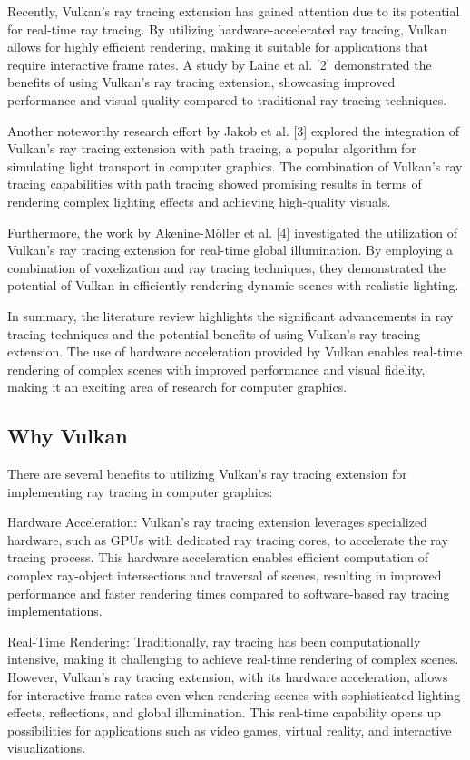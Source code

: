 \documentclass[conference]{IEEEtran}
\begin{document}
Recently, Vulkan's ray tracing extension has gained attention due to its potential for real-time ray tracing. By utilizing hardware-accelerated ray tracing, Vulkan allows for highly efficient rendering, making it suitable for applications that require interactive frame rates. A study by Laine et al. [2] demonstrated the benefits of using Vulkan's ray tracing extension, showcasing improved performance and visual quality compared to traditional ray tracing techniques.

Another noteworthy research effort by Jakob et al. [3] explored the integration of Vulkan's ray tracing extension with path tracing, a popular algorithm for simulating light transport in computer graphics. The combination of Vulkan's ray tracing capabilities with path tracing showed promising results in terms of rendering complex lighting effects and achieving high-quality visuals.

Furthermore, the work by Akenine-Möller et al. [4] investigated the utilization of Vulkan's ray tracing extension for real-time global illumination. By employing a combination of voxelization and ray tracing techniques, they demonstrated the potential of Vulkan in efficiently rendering dynamic scenes with realistic lighting.

In summary, the literature review highlights the significant advancements in ray tracing techniques and the potential benefits of using Vulkan's ray tracing extension. The use of hardware acceleration provided by Vulkan enables real-time rendering of complex scenes with improved performance and visual fidelity, making it an exciting area of research for computer graphics.
\subsection{Why Vulkan} \label{title}
There are several benefits to utilizing Vulkan's ray tracing extension for implementing ray tracing in computer graphics:

Hardware Acceleration: Vulkan's ray tracing extension leverages specialized hardware, such as GPUs with dedicated ray tracing cores, to accelerate the ray tracing process. This hardware acceleration enables efficient computation of complex ray-object intersections and traversal of scenes, resulting in improved performance and faster rendering times compared to software-based ray tracing implementations.

Real-Time Rendering: Traditionally, ray tracing has been computationally intensive, making it challenging to achieve real-time rendering of complex scenes. However, Vulkan's ray tracing extension, with its hardware acceleration, allows for interactive frame rates even when rendering scenes with sophisticated lighting effects, reflections, and global illumination. This real-time capability opens up possibilities for applications such as video games, virtual reality, and interactive visualizations.
\end{document}
